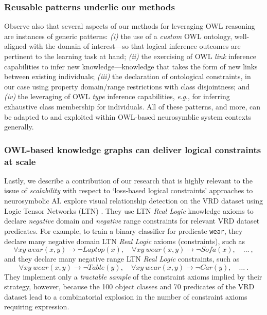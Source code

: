 \documentclass[]{jair}
\newcommand{\eg}{\textit{e}.\textit{g}.,\xspace}
\begin{document}
\subsubsection{Reusable patterns underlie our methods}
Observe also that several aspects of our methods for leveraging OWL reasoning are instances of generic patterns: \emph{(i)} the use of a \emph{custom} OWL ontology, well-aligned with the domain of interest---so that logical inference outcomes are pertinent to the learning task at hand; \emph{(ii)} the exercising of OWL \emph{link} inference capabilities to infer new knowledge---knowledge that takes the form of new links between existing individuals; \emph{(iii)} the declaration of ontological constraints, in our case using property domain/range restrictions with class disjointness; and \emph{(iv)} the leveraging of OWL \emph{type} inference capabilities, \eg for inferring exhaustive class membership for individuals.
All of these patterns, and more, can be adapted to and exploited within OWL-based neurosymblic system contexts generally.

\subsubsection{OWL-based knowledge graphs can deliver logical constraints at scale}
Lastly, we describe a contribution of our research that is highly relevant to the issue of \emph{scalability} with respect to `loss-based logical constraints' approaches to neurosymbolic AI.
\citet{DBLP:conf/ijcnn/DonadelloS19} explore visual relationship detection on the VRD dataset \cite{lu2016visual} using Logic Tensor Networks (LTN) \cite{DBLP:conf/nesy/SerafiniG16,DBLP:journals/ai/BadreddineGSS22}.
They use LTN \emph{Real Logic} knowledge axioms to declare \emph{negative} domain and \emph{negative} range constraints for relevant VRD dataset predicates.
For example, to train a binary classifier for predicate \texttt{wear}, they declare many negative domain LTN \emph{Real Logic} axioms (constraints), such as 
\begin{displaymath}
  \forall x y \ wear(x, y) \rightarrow \lnot Laptop(x), \quad 
  \forall x y \ wear(x, y) \rightarrow \lnot Sofa(x), \quad 
  \dots \ ,
\end{displaymath}
and they declare many negative range LTN \emph{Real Logic} constraints, such as
\begin{displaymath}
  \forall x y \ wear(x, y) \rightarrow \lnot Table(y), \quad 
  \forall x y \ wear(x, y) \rightarrow \lnot Car(y), \quad 
  \dots \ .
\end{displaymath}
They implement only a \emph{tractable sample} of the constraint axioms implied by their strategy, however, because the 100 object classes and 70 predicates of the VRD dataset lead to a combinatorial explosion in the number of constraint axioms requiring expression.
\end{document}
